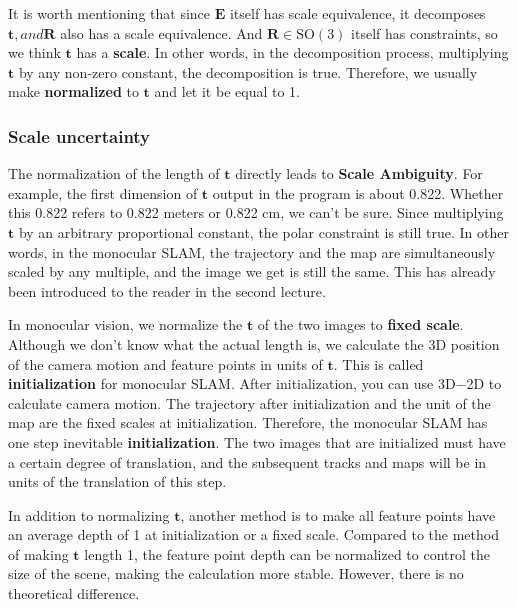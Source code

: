 It is worth mentioning that since $\bm{E}$ itself has scale equivalence, it decomposes $\bm{t}, and \bm{R}$ also has a scale equivalence. And $\bm{R} \in \mathrm{SO}(3)$ itself has constraints, so we think $\bm{t}$ has a \textbf{scale}. In other words, in the decomposition process, multiplying $\bm{t}$ by any non-zero constant, the decomposition is true. Therefore, we usually make \textbf{normalized} to $\bm{t}$ and let it be equal to 1.

\subsubsection{Scale uncertainty}
The normalization of the length of $\bm{t}$ directly leads to \textbf{Scale Ambiguity}. For example, the first dimension of $\bm{t}$ output in the program is about 0.822. Whether this 0.822 refers to 0.822 meters or 0.822 cm, we can't be sure. Since multiplying $\bm{t}$ by an arbitrary proportional constant, the polar constraint is still true. In other words, in the monocular SLAM, the trajectory and the map are simultaneously scaled by any multiple, and the image we get is still the same. This has already been introduced to the reader in the second lecture.

In monocular vision, we normalize the $\bm{t}$ of the two images to \textbf{fixed scale}. Although we don't know what the actual length is, we calculate the 3D position of the camera motion and feature points in units of $\bm{t}$. This is called \textbf{initialization} for monocular SLAM. After initialization, you can use 3D−2D to calculate camera motion. The trajectory after initialization and the unit of the map are the fixed scales at initialization. Therefore, the monocular SLAM has one step inevitable \textbf{initialization}. The two images that are initialized must have a certain degree of translation, and the subsequent tracks and maps will be in units of the translation of this step.

In addition to normalizing $\bm{t}$, another method is to make all feature points have an average depth of 1 at initialization or a fixed scale. Compared to the method of making $\bm{t}$ length 1, the feature point depth can be normalized to control the size of the scene, making the calculation more stable. However, there is no theoretical difference.

